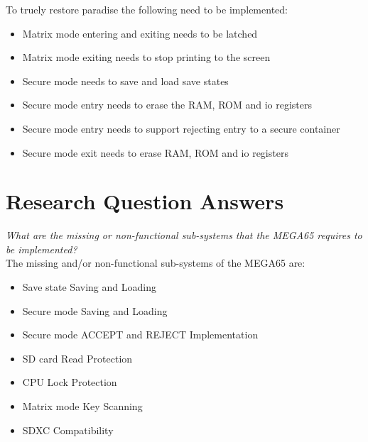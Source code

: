 To truely restore paradise the following need to be implemented:
\begin{itemize}
\item{Matrix mode entering and exiting needs to be latched}
\item{Matrix mode exiting needs to stop printing to the screen}
\item{Secure mode needs to save and load save states}
\item{Secure mode entry needs to erase the RAM, ROM and io registers}
\item{Secure mode entry needs to support rejecting entry to a secure container}
\item{Secure mode exit needs to erase RAM, ROM and io registers}
\end{itemize}


\section{Research Question Answers}

\label{Ch9 Sec2}

\textit{What are the missing or non-functional sub-systems that the MEGA65 requires to be implemented?}\\
The missing and/or non-functional sub-systems of the MEGA65 are:
\begin{itemize}
\item{Save state Saving and Loading}
\item{Secure mode Saving and Loading}
\item{Secure mode ACCEPT and REJECT Implementation}
\item{SD card Read Protection}
\item{CPU Lock Protection}
\item{Matrix mode Key Scanning}
\item{SDXC Compatibility}
\end{itemize}


